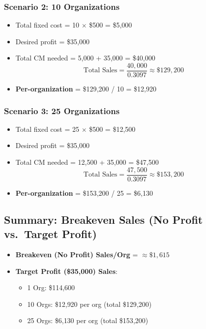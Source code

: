 \documentclass[12pt]{article}
\begin{document}
\subsubsection*{Scenario 2: 10 Organizations}
\begin{itemize}
    \item Total fixed cost = 10 $\times$ \$500 = \$5{,}000
    \item Desired profit = \$35{,}000
    \item Total CM needed = 5{,}000 + 35{,}000 = \$40{,}000
\[
\text{Total Sales} 
= \frac{40{,}000}{0.3097} 
\approx \$129{,}200
\]
\item \textbf{Per-organization} = \$129{,}200 / 10 = \$12{,}920
\end{itemize}

\subsubsection*{Scenario 3: 25 Organizations}
\begin{itemize}
    \item Total fixed cost = 25 $\times$ \$500 = \$12{,}500
    \item Desired profit = \$35{,}000
    \item Total CM needed = 12{,}500 + 35{,}000 = \$47{,}500
\[
\text{Total Sales} 
= \frac{47{,}500}{0.3097} 
\approx \$153{,}200
\]
\item \textbf{Per-organization} = \$153{,}200 / 25 = \$6{,}130
\end{itemize}

\subsection*{Summary: Breakeven Sales (No Profit vs.\ Target Profit)}
\begin{itemize}
    \item \textbf{Breakeven (No Profit) Sales/Org} = \(\approx \$1{,}615\)
    \item \textbf{Target Profit (\$35{,}000) Sales}:
    \begin{itemize}
        \item 1 Org: \$114{,}600
        \item 10 Orgs: \$12{,}920 per org (total \$129{,}200)
        \item 25 Orgs: \$6{,}130 per org (total \$153{,}200)
    \end{itemize}
\end{itemize}
\end{document}

